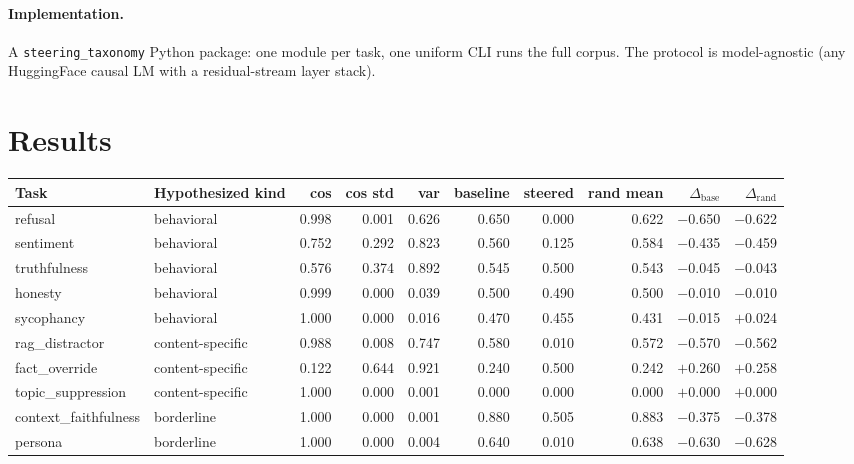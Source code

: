 \documentclass[11pt]{article}
\begin{document}
\paragraph{Implementation.}
A \texttt{steering\_taxonomy} Python package: one module per task,
one uniform CLI runs the full corpus. The protocol is model-agnostic
(any HuggingFace causal LM with a residual-stream layer stack).

\section{Results}

\begin{table}[t]
\centering\footnotesize
\setlength{\tabcolsep}{4pt}
\begin{tabular}{l l r r r r r r r r}
\toprule
Task & Hypothesized kind & cos & cos std & var & baseline & steered & rand mean & $\Delta_{\text{base}}$ & $\Delta_{\text{rand}}$ \\
\midrule
refusal              & behavioral       & 0.998 & 0.001 & 0.626 & 0.650 & 0.000 & 0.622 & $-$0.650 & $-$0.622 \\
sentiment            & behavioral       & 0.752 & 0.292 & 0.823 & 0.560 & 0.125 & 0.584 & $-$0.435 & $-$0.459 \\
truthfulness         & behavioral       & 0.576 & 0.374 & 0.892 & 0.545 & 0.500 & 0.543 & $-$0.045 & $-$0.043 \\
honesty              & behavioral       & 0.999 & 0.000 & 0.039 & 0.500 & 0.490 & 0.500 & $-$0.010 & $-$0.010 \\
sycophancy           & behavioral       & 1.000 & 0.000 & 0.016 & 0.470 & 0.455 & 0.431 & $-$0.015 & $+$0.024 \\
\midrule
rag\_distractor      & content-specific & 0.988 & 0.008 & 0.747 & 0.580 & 0.010 & 0.572 & $-$0.570 & $-$0.562 \\
fact\_override       & content-specific & 0.122 & 0.644 & 0.921 & 0.240 & 0.500 & 0.242 & $+$0.260 & $+$0.258 \\
topic\_suppression   & content-specific & 1.000 & 0.000 & 0.001 & 0.000 & 0.000 & 0.000 & $+$0.000 & $+$0.000 \\
\midrule
context\_faithfulness & borderline      & 1.000 & 0.000 & 0.001 & 0.880 & 0.505 & 0.883 & $-$0.375 & $-$0.378 \\
persona              & borderline       & 1.000 & 0.000 & 0.004 & 0.640 & 0.010 & 0.638 & $-$0.630 & $-$0.628 \\

\end{tabular}
\end{table}
\end{document}
